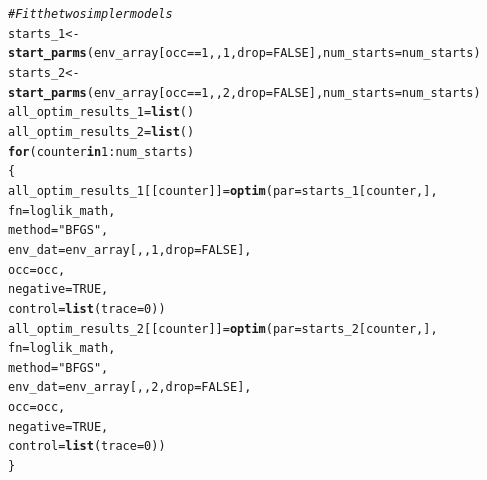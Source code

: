 \documentclass[11pt]{article}\usepackage[]{graphicx}\usepackage[]{xcolor}
\makeatletter
\newcommand{\hlnum}[1]{\textcolor[rgb]{0.686,0.059,0.569}{#1}}%
\newcommand{\hlsng}[1]{\textcolor[rgb]{0.192,0.494,0.8}{#1}}%
\newcommand{\hlcom}[1]{\textcolor[rgb]{0.678,0.584,0.686}{\textit{#1}}}%
\newcommand{\hlopt}[1]{\textcolor[rgb]{0,0,0}{#1}}%
\newcommand{\hldef}[1]{\textcolor[rgb]{0.345,0.345,0.345}{#1}}%
\newcommand{\hlkwa}[1]{\textcolor[rgb]{0.161,0.373,0.58}{\textbf{#1}}}%
\newcommand{\hlkwb}[1]{\textcolor[rgb]{0.69,0.353,0.396}{#1}}%
\newcommand{\hlkwc}[1]{\textcolor[rgb]{0.333,0.667,0.333}{#1}}%
\newcommand{\hlkwd}[1]{\textcolor[rgb]{0.737,0.353,0.396}{\textbf{#1}}}%
\newenvironment{kframe}{%
 \def\at@end@of@kframe{}%
 \ifinner\ifhmode%
  \def\at@end@of@kframe{\end{minipage}}%
  \begin{minipage}{\columnwidth}%
 \fi\fi%
 \def\FrameCommand##1{\hskip\@totalleftmargin \hskip-\fboxsep
 \colorbox{shadecolor}{##1}\hskip-\fboxsep
     \hskip-\linewidth \hskip-\@totalleftmargin \hskip\columnwidth}%
 \MakeFramed {\advance\hsize-\width
   \@totalleftmargin\z@ \linewidth\hsize
   \@setminipage}}%
 {\par\unskip\endMakeFramed%
 \at@end@of@kframe}
\newenvironment{knitrout}{}{} %
\makeatother
\begin{document}
\begin{knitrout}
\color{fgcolor}\begin{kframe}
\begin{alltt}
\hlcom{#Fit the two simpler models}
\hldef{starts_1} \hlkwb{<-} \hlkwd{start_parms}\hldef{(env_array[occ}\hlopt{==}\hlnum{1}\hldef{,,}\hlnum{1}\hldef{,}\hlkwc{drop}\hldef{=}\hlnum{FALSE}\hldef{],}\hlkwc{num_starts}\hldef{=num_starts)}
\hldef{starts_2} \hlkwb{<-} \hlkwd{start_parms}\hldef{(env_array[occ}\hlopt{==}\hlnum{1}\hldef{, ,} \hlnum{2}\hldef{,}\hlkwc{drop}\hldef{=}\hlnum{FALSE}\hldef{],}\hlkwc{num_starts}\hldef{=num_starts)}
\hldef{all_optim_results_1} \hlkwb{=} \hlkwd{list}\hldef{()}
\hldef{all_optim_results_2} \hlkwb{=} \hlkwd{list}\hldef{()}
\hlkwa{for} \hldef{(counter} \hlkwa{in} \hlnum{1}\hlopt{:}\hldef{num_starts)}
\hldef{\{}
  \hldef{all_optim_results_1[[counter]]}\hlkwb{=}\hlkwd{optim}\hldef{(}\hlkwc{par}\hldef{=starts_1[counter,],}
                                       \hlkwc{fn}\hldef{=loglik_math,}
                                       \hlkwc{method}\hldef{=}\hlsng{"BFGS"}\hldef{,}
                                       \hlkwc{env_dat}\hldef{=env_array[,,}\hlnum{1}\hldef{,}\hlkwc{drop}\hldef{=}\hlnum{FALSE}\hldef{],}
                                       \hlkwc{occ}\hldef{=occ,}
                                       \hlkwc{negative}\hldef{=}\hlnum{TRUE}\hldef{,}
                                       \hlkwc{control}\hldef{=}\hlkwd{list}\hldef{(}\hlkwc{trace}\hldef{=}\hlnum{0}\hldef{))}
  \hldef{all_optim_results_2[[counter]]}\hlkwb{=}\hlkwd{optim}\hldef{(}\hlkwc{par}\hldef{=starts_2[counter,],}
                                       \hlkwc{fn}\hldef{=loglik_math,}
                                       \hlkwc{method}\hldef{=}\hlsng{"BFGS"}\hldef{,}
                                       \hlkwc{env_dat}\hldef{=env_array[,,}\hlnum{2}\hldef{,}\hlkwc{drop}\hldef{=}\hlnum{FALSE}\hldef{],}
                                       \hlkwc{occ}\hldef{=occ,}
                                       \hlkwc{negative}\hldef{=}\hlnum{TRUE}\hldef{,}
                                       \hlkwc{control}\hldef{=}\hlkwd{list}\hldef{(}\hlkwc{trace}\hldef{=}\hlnum{0}\hldef{))}
\hldef{\}}
\end{alltt}
\end{kframe}
\end{knitrout}
\end{document}
